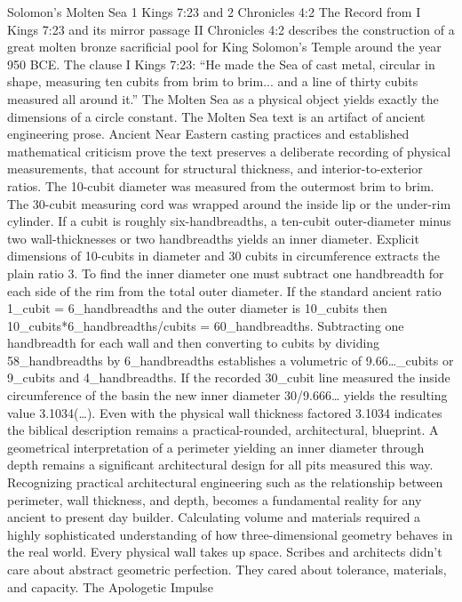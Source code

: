 Solomon’s Molten Sea
1 Kings 7:23 and 2 Chronicles 4:2
The Record from I Kings 7:23 and its mirror passage II Chronicles 4:2 describes the construction of a great molten bronze sacrificial pool for King Solomon’s Temple around the year 950 BCE. The clause I Kings 7:23: 
“He made the Sea of cast metal, circular in shape, measuring ten cubits from brim to brim... and a line of thirty cubits measured all around it.”
The Molten Sea as a physical object yields exactly the dimensions of a circle constant. The Molten Sea text is an artifact of ancient engineering prose. Ancient Near Eastern casting practices and established mathematical criticism prove the text preserves a deliberate recording of physical measurements, that account for structural thickness, and interior-to-exterior ratios. The 10-cubit diameter was measured from the outermost brim to brim. The 30-cubit measuring cord was wrapped around the inside lip or the under-rim cylinder. If a cubit is roughly six-handbreadths, a ten-cubit outer-diameter minus two wall-thicknesses or two handbreadths yields an inner diameter. Explicit dimensions of 10-cubits in diameter and 30 cubits in circumference extracts the plain ratio 3. 
To find the inner diameter one must subtract one handbreadth for each side of the rim from the total outer diameter. If the standard ancient ratio 1_cubit = 6_handbreadths and the outer diameter is 10_cubits then 10_cubits*6_handbreadths/cubits = 60_handbreadths. Subtracting one handbreadth for each wall and then converting to cubits by dividing 58_handbreadths by 6_handbreadths establishes a volumetric of 9.66…_cubits or 9_cubits and 4_handbreadths. If the recorded 30_cubit line measured the inside circumference of the basin the new inner diameter 30/9.666… yields the resulting value 3.1034(…). 
Even with the physical wall thickness factored 3.1034 indicates the biblical description remains a practical-rounded, architectural, blueprint. A geometrical interpretation of a perimeter yielding an inner diameter through depth remains a significant architectural design for all pits measured this way. Recognizing practical architectural engineering such as the relationship between perimeter, wall thickness, and depth, becomes a fundamental reality for any ancient to present day builder. Calculating volume and materials required a highly sophisticated understanding of how three-dimensional geometry behaves in the real world. Every physical wall takes up space. Scribes and architects didn’t care about abstract geometric perfection. They cared about tolerance, materials, and capacity. 
The Apologetic Impulse
